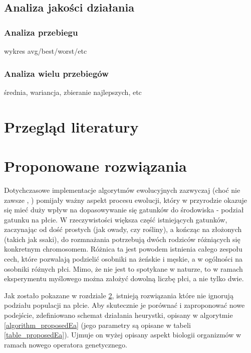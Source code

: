 \documentclass[twoside]{iisthesis}
\begin{document}
\section{Analiza jakości działania}
\subsection{Analiza przebiegu}
wykres avg/best/worst/etc
\subsection{Analiza wielu przebiegów}
średnia, wariancja, zbieranie najlepszych, etc
\chapter{Przegląd literatury} \label{chapter_literature}
\chapter{Proponowane rozwiązania} \label{chapter_proposed}

Dotychczasowe implementacje algorytmów ewolucyjnych zazwyczaj (choć nie zawsze \cite{GGA}, \cite{SexualGA}) pomijały ważny aspekt procesu ewolucji, który w przyrodzie okazuje się mieć duży wpływ na dopasowywanie się gatunków do środowiska - podział gatunku na płcie. W rzeczywistości większa część istniejących gatunków, zaczynając od dość prostych (jak owady, czy rośliny), a kończąc na złożonych (takich jak ssaki), do rozmnażania potrzebują dwóch rodziców różniących się konkretnym chromosomem. Różnica ta jest powodem istnienia całego zespołu cech, które pozwalają podzielić osobniki na żeńskie i męskie, a w ogólności na osobniki różnych płci. Mimo, że nie jest to spotykane w naturze, to w ramach eksperymentu myślowego można założyć dowolną liczbę płci, a nie tylko dwie.

Jak zostało pokazane w rozdziale \ref{chapter_literature}, istnieją rozwiązania które nie ignorują podziału populacji na płcie. Aby skutecznie je porównać i zaproponować nowe podejście, zdefiniowano schemat działania heurystki, opisany w algorytmie \ref{algorithm_proposedEa} (jego parametry są opisane w tabeli \ref{table_proposedEa}). Ujmuje on wyżej opisany aspekt biologii organizmów w ramach nowego operatora genetycznego.
\end{document}
